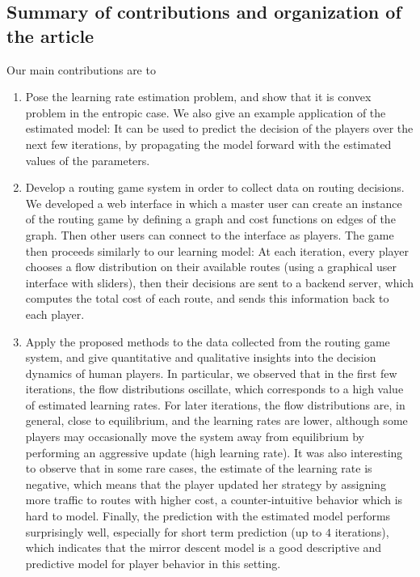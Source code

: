 \documentclass{sig-alternate-ipsn13}
\begin{document}
\subsection{Summary of contributions and organization of the article}
Our main contributions are to
\begin{enumerate}
\item Pose the learning rate estimation problem, and show that it is convex problem in the entropic case. We also give an example application of the estimated model: It can be used to predict the decision of the players over the next few iterations, by propagating the model forward with the estimated values of the parameters.
\item Develop a routing game system in order to collect data on routing decisions. We developed a web interface in which a master user can create an instance of the routing game by defining a graph and cost functions on edges of the graph. Then other users can connect to the interface as players. The game then proceeds similarly to our learning model: At each iteration, every player chooses a flow distribution on their available routes (using a graphical user interface with sliders), then their decisions are sent to a backend server, which computes the total cost of each route, and sends this information back to each player.
\item Apply the proposed methods to the data collected from the routing game system, and give quantitative and qualitative insights into the decision dynamics of human players. In particular, we observed that in the first few iterations, the flow distributions oscillate, which corresponds to a high value of estimated learning rates. For later iterations, the flow distributions are, in general, close to equilibrium, and the learning rates are lower, although some players may occasionally move the system away from equilibrium by performing an aggressive update (high learning rate). It was also interesting to observe that in some rare cases, the estimate of the learning rate is negative, which means that the player updated her strategy by assigning more traffic to routes with higher cost, a counter-intuitive behavior which is hard to model. Finally, the prediction with the estimated model performs surprisingly well, especially for short term prediction (up to $4$ iterations), which indicates that the mirror descent model is a good descriptive and predictive model for player behavior in this setting.
\end{enumerate}
\end{document}

